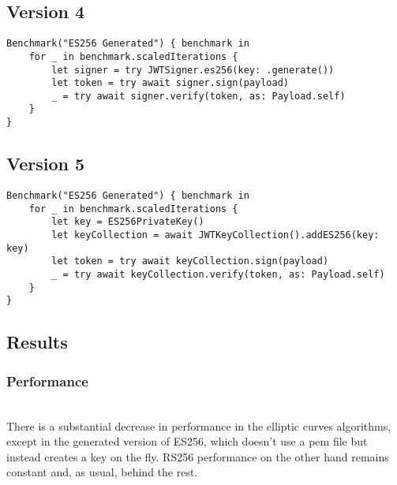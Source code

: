 \subsection*{Version 4}
\begin{verbatim}
Benchmark("ES256 Generated") { benchmark in
    for _ in benchmark.scaledIterations {
        let signer = try JWTSigner.es256(key: .generate())
        let token = try await signer.sign(payload)
        _ = try await signer.verify(token, as: Payload.self)
    }
}
\end{verbatim}

\subsection*{Version 5}
\begin{verbatim}
Benchmark("ES256 Generated") { benchmark in
    for _ in benchmark.scaledIterations {
        let key = ES256PrivateKey()
        let keyCollection = await JWTKeyCollection().addES256(key: key)
        let token = try await keyCollection.sign(payload)
        _ = try await keyCollection.verify(token, as: Payload.self)
    }
}
\end{verbatim}

\subsection*{Results}

\subsubsection*{Performance}
 \\
There is a substantial decrease in performance in the elliptic curves algorithms, except in the generated version of ES256, which doesn't use a \gls{pem} file but instead creates a key on the fly. RS256 performance on the other hand remains constant and, as usual, behind the rest.

